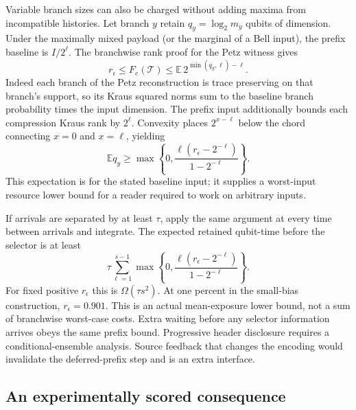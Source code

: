 \documentclass[11pt]{article}
\begin{document}
Variable branch sizes can also be charged without adding maxima from
incompatible histories. Let branch $y$ retain $q_y=\log_2m_y$ qubits of
dimension. Under the maximally mixed payload (or the marginal of a Bell input),
the prefix baseline is $I/2^\ell$. The branchwise rank proof for the Petz
witness gives
\begin{equation}
 r_\epsilon\le F_e(\mathcal T)
 \le\mathbb E\,2^{\min(q_y,\ell)-\ell}.
\end{equation}
Indeed each branch of the Petz reconstruction is trace preserving on that
branch's support, so its Kraus squared norms sum to the baseline branch
probability times the input dimension. The prefix input additionally bounds
each compression Kraus rank by $2^\ell$. Convexity places $2^{x-\ell}$ below
the chord connecting $x=0$ and $x=\ell$, yielding
\begin{equation}
 \mathbb E q_y\ge
 \max\left\{0,\frac{\ell(r_\epsilon-2^{-\ell})}{1-2^{-\ell}}\right\}.
 \label{eq:meanmemory}
\end{equation}
This expectation is for the stated baseline input; it supplies a worst-input
resource lower bound for a reader required to work on arbitrary inputs.

If arrivals are separated by at least $\tau$, apply the same argument at
every time between arrivals and integrate. The expected retained qubit-time
before the selector is at least
\begin{equation}
 \tau\sum_{\ell=1}^{s-1}
 \max\left\{0,\frac{\ell(r_\epsilon-2^{-\ell})}{1-2^{-\ell}}\right\}.
 \label{eq:exposure}
\end{equation}
For fixed positive $r_\epsilon$ this is $\Omega(\tau s^2)$. At one percent
in the small-bias construction, $r_\epsilon=0.901$. This is an actual
mean-exposure lower bound, not a sum of branchwise worst-case costs. Extra
waiting before any selector information arrives obeys the same prefix bound.
Progressive header disclosure requires a conditional-ensemble analysis.
Source feedback that changes the
encoding would invalidate the deferred-prefix step and is an extra interface.

\subsection{An experimentally scored consequence}
\end{document}
